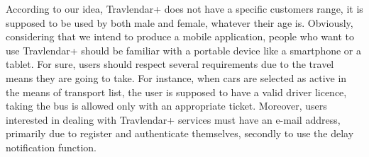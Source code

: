According to our idea, Travlendar+ does not have a specific customers range, it is supposed to be used by both male and female, whatever their age is.
Obviously, considering that we intend to produce a mobile application, people who want to use Travlendar+ should be familiar with a portable device like a smartphone or a tablet. 
For sure, users should respect several requirements due to the travel means they are going to take. For instance, when cars are selected as active in the means of transport list, the user is supposed to have a valid driver licence, taking the bus is allowed only with an appropriate ticket.
Moreover, users interested in dealing with Travlendar+ services must have an e-mail address, primarily due to register and authenticate themselves, secondly to use the delay notification function.
